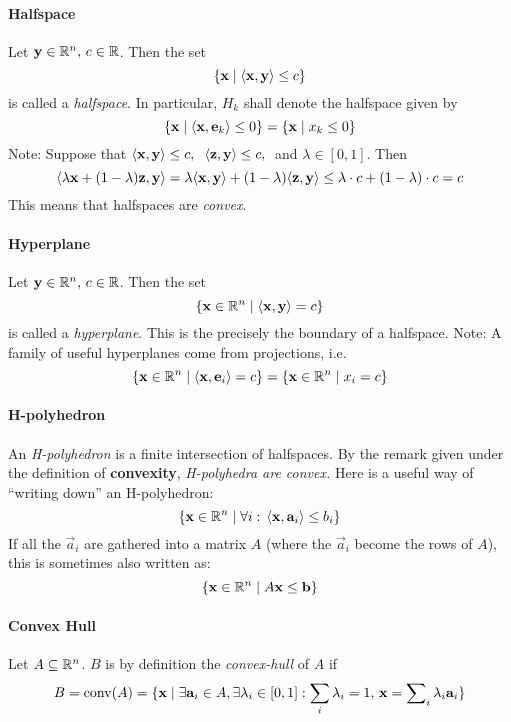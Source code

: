 \paragraph{Halfspace}
Let $\mathbf{y} \in \mathbb{R}^n,\, c \in \mathbb{R}$.  Then the set
  \[ \{\mathbf{x} \;|\; \langle \mathbf{x}, \mathbf{y} \rangle \leq c\} \]
is called a \textit{halfspace}.  In particular, $H_k$ shall denote the halfspace given by
  \[ \{\mathbf{x} \;|\; \langle \mathbf{x}, \mathbf{e}_k \rangle \leq 0 \} = 
     \{\mathbf{x} \;|\; x_k \leq 0 \} \]
Note:  Suppose that 
  $\langle \mathbf{x}, \mathbf{y} \rangle \leq c,\;$ 
  $\langle \mathbf{z}, \mathbf{y} \rangle \leq c,\;$ and
  $\lambda \in [0,1]$.  Then
  \[ \langle \lambda \mathbf{x} + (1-\lambda) \mathbf{z}, \mathbf{y} \rangle = 
    \lambda \langle \mathbf{x}, \mathbf{y} \rangle + (1-\lambda) \langle \mathbf{z}, \mathbf{y} \rangle \leq \lambda \cdot c + (1-\lambda) \cdot c = c
  \]
  This means that halfspaces are \textit{convex}.

\paragraph{Hyperplane}
Let $\mathbf{y} \in \mathbb{R}^n,\, c \in \mathbb{R}$.  Then the set
  \[ \{\mathbf{x} \in \mathbb{R}^n \;|\; \langle \mathbf{x}, \mathbf{y} \rangle = c\} \]
is called a \textit{hyperplane}.  This is the precisely the boundary of a halfspace.
Note:  A family of useful hyperplanes come from projections, i.e.
  \[ \{\mathbf{x} \in \mathbb{R}^n \;|\; \langle \mathbf{x}, \mathbf{e}_i \rangle = c\} = 
     \{\mathbf{x} \in \mathbb{R}^n \;|\; x_i = c\} \]

\paragraph{H-polyhedron}
An \textit{H-polyhedron} is a finite intersection of halfspaces.  By the remark given under the definition of \textbf{convexity}, \textit{H-polyhedra are convex.}  Here is a useful way of ``writing down'' an H-polyhedron:
  \[ \{ \mathbf{x} \in \mathbb{R}^n \;|\; 
    \forall i:\, \langle \mathbf{x}, \mathbf{a}_i \rangle \leq b_i \} \]
If all the $\vec{a}_i$ are gathered into a matrix $A$ (where the $\vec{a}_i$ become the rows of $A$), this is sometimes also written as:
  \[ \{ \mathbf{x} \in \mathbb{R}^n \;|\; A\mathbf{x} \leq \mathbf{b} \} \]

\paragraph{Convex Hull}
Let $A \subseteq \mathbb{R}^n$.  $B$ is by definition the \textit{convex-hull} of $A$ if
  \[ B = \operatorname{conv}(A) = \{ \mathbf{x} \;|\; \exists \mathbf{a}_i \in A, \exists\lambda_i \in [0,1]: \sum_i \lambda_i = 1,\,\mathbf{x} = \sum\nolimits_{i} \lambda_{i} \mathbf{a}_{i} \} \]

